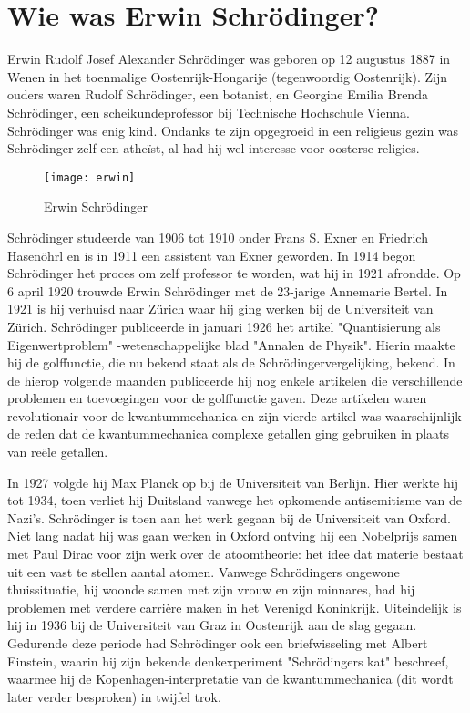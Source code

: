\documentclass[11pt,fleqn]{book} %
\begin{document}
\section{Wie was Erwin Schrödinger?}
Erwin Rudolf Josef Alexander Schrödinger was geboren op 12 augustus 1887 in Wenen in het toenmalige Oostenrijk-Hongarije (tegenwoordig Oostenrijk). Zijn ouders waren Rudolf Schrödinger, een botanist, en Georgine Emilia Brenda Schrödinger, een scheikundeprofessor bij Technische Hochschule Vienna. Schrödinger was enig kind. Ondanks te zijn opgegroeid in een religieus gezin was Schrödinger zelf een atheïst, al had hij wel interesse voor oosterse religies.
\begin{figure}[h]
	\centering\texttt{[image: erwin]}
	\caption{Erwin Schrödinger}
	\label{fig:erwin}
\end{figure}
Schrödinger studeerde van 1906 tot 1910 onder Frans S. Exner en Friedrich Hasenöhrl en is in 1911 een assistent van Exner geworden. In 1914 begon Schrödinger het proces om zelf professor te worden, wat hij in 1921 afrondde. Op 6 april 1920 trouwde Erwin Schrödinger met de 23-jarige Annemarie Bertel. In 1921 is hij verhuisd naar Zürich waar hij ging werken bij de Universiteit van Zürich. 
Schrödinger publiceerde in januari 1926 het artikel "Quantisierung als Eigenwertproblem" -wetenschappelijke blad "Annalen de Physik". Hierin maakte hij de golffunctie, die nu bekend staat als de Schrödingervergelijking, bekend. In de hierop volgende maanden publiceerde hij nog enkele artikelen die verschillende problemen en toevoegingen voor de golffunctie gaven. Deze artikelen waren revolutionair voor de kwantummechanica en zijn vierde artikel was waarschijnlijk de reden dat de kwantummechanica complexe getallen ging gebruiken in plaats van reële getallen.

In 1927 volgde hij Max Planck op bij de Universiteit van Berlijn. Hier werkte hij tot 1934, toen verliet hij Duitsland vanwege het opkomende antisemitisme van de Nazi's. Schrödinger is toen aan het werk gegaan bij de Universiteit van Oxford. Niet lang nadat hij was gaan werken in Oxford ontving hij een Nobelprijs samen met Paul Dirac voor zijn werk over de atoomtheorie: het idee dat materie bestaat uit een vast te stellen aantal atomen. Vanwege Schrödingers ongewone thuissituatie, hij woonde samen met zijn vrouw en zijn minnares, had hij problemen met verdere carrière maken in het Verenigd Koninkrijk. Uiteindelijk is hij in 1936 bij de Universiteit van Graz in Oostenrijk aan de slag gegaan. Gedurende deze periode had Schrödinger ook een briefwisseling met Albert Einstein, waarin hij zijn bekende denkexperiment "Schrödingers kat" beschreef, waarmee hij de Kopenhagen-interpretatie van de kwantummechanica (dit wordt later verder besproken) in twijfel trok.
\end{document}
